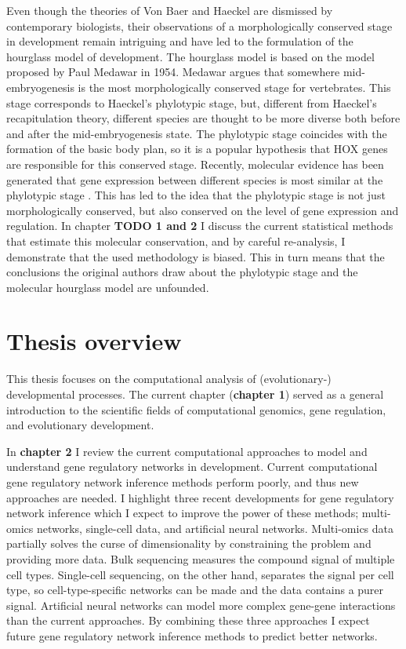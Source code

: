Even though the theories of Von Baer and Haeckel are dismissed by contemporary biologists, their observations of a morphologically conserved stage in development remain intriguing and have led to the formulation of the hourglass model of development. The hourglass model is based on the model proposed by Paul Medawar in 1954\cite{Medawar1954}. Medawar argues that somewhere mid-embryogenesis is the most morphologically conserved stage for vertebrates. This stage corresponds to Haeckel's phylotypic stage, but, different from Haeckel's recapitulation theory, different species are thought to be more diverse both before and after the mid-embryogenesis state. The phylotypic stage coincides with the formation of the basic body plan, so it is a popular hypothesis that HOX genes are responsible for this conserved stage. Recently, molecular evidence has been generated that gene expression between different species is most similar at the phylotypic stage \cite{Levin2016,marletaz2018,Mayshar2023,Liu2021,DomazetLoso2010,Irie2011,Kalinka2010,Piasecka2013,Uesaka2019}. This has led to the idea that the phylotypic stage is not just morphologically conserved, but also conserved on the level of gene expression and regulation. In chapter \textbf{TODO 1 and 2} I discuss the current statistical methods that estimate this molecular conservation, and by careful re-analysis, I demonstrate that the used methodology is biased. This in turn means that the conclusions the original authors draw about the phylotypic stage and the molecular hourglass model are unfounded. 

\section{Thesis overview}

This thesis focuses on the computational analysis of (evolutionary-) developmental processes. The current chapter (\textbf{chapter 1}) served as a general introduction to the scientific fields of computational genomics, gene regulation, and evolutionary development.  

In \textbf{chapter 2} I review the current computational approaches to model and understand gene regulatory networks in development. Current computational gene regulatory network inference methods perform poorly, and thus new approaches are needed. I highlight three recent developments for gene regulatory network inference which I expect to improve the power of these methods; multi-omics networks, single-cell data, and artificial neural networks. Multi-omics data partially solves the curse of dimensionality by constraining the problem and providing more data. Bulk sequencing measures the compound signal of multiple cell types. Single-cell sequencing, on the other hand, separates the signal per cell type, so cell-type-specific networks can be made and the data contains a purer signal. Artificial neural networks can model more complex gene-gene interactions than the current approaches. By combining these three approaches I expect future gene regulatory network inference methods to predict better networks.

